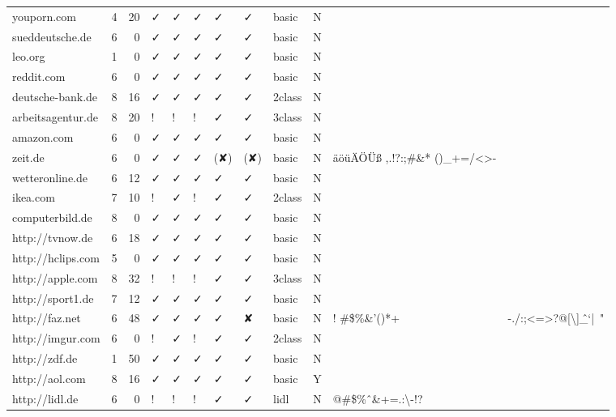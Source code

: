 {\begin{longtable}{lrrlllllllp{1cm}p{1cm}}
		youporn.com & 4     & 20    & ✓ & ✓ & ✓ & ✓ & ✓ & basic & N     &       &  \\
		sueddeutsche.de & 6     & 0     & ✓ & ✓ & ✓ & ✓ & ✓ & basic & N     &       &  \\
		leo.org & 1     & 0     & ✓ & ✓ & ✓ & ✓ & ✓ & basic & N     &       &  \\
		reddit.com & 6     & 0     & ✓ & ✓ & ✓ & ✓ & ✓ & basic & N     &       &  \\
		deutsche-bank.de & 8     & 16    & ✓ & ✓ & ✓ & ✓ & ✓ & 2class & N     &       &  \\
		arbeitsagentur.de & 8     & 20    & ! & ! & ! & ✓ & ✓ & 3class & N     &       &  \\
		amazon.com & 6     & 0     & ✓ & ✓ & ✓ & ✓ & ✓ & basic & N     &       &  \\
		zeit.de & 6     & 0     & ✓ & ✓ & ✓ & (✘) & (✘) & basic & N     & \multicolumn{1}{l}{äöüÄÖÜß ,.!?:;\#\&* ()\_+=/<>-} &  \\
		wetteronline.de & 6     & 12    & ✓ & ✓ & ✓ & ✓ & ✓ & basic & N     &       &  \\
		ikea.com & 7     & 10    & ! & ✓ & ! & ✓ & ✓ & 2class & N     &       &  \\
		computerbild.de & 8     & 0     & ✓ & ✓ & ✓ & ✓ & ✓ & basic & N     &       &  \\
		http://tvnow.de & 6     & 18    & ✓ & ✓ & ✓ & ✓ & ✓ & basic & N     &       &  \\
		http://hclips.com & 5     & 0     & ✓ & ✓ & ✓ & ✓ & ✓ & basic & N     &       &  \\
		http://apple.com & 8     & 32    & ! & ! & ! & ✓ & ✓ & 3class & N     &       &  \\
		http://sport1.de & 7     & 12    & ✓ & ✓ & ✓ & ✓ & ✓ & basic & N     &       &  \\
		http://faz.net & 6     & 48    & ✓ & ✓ & ✓ & ✓ & ✘ & basic & N     & \multicolumn{1}{l}{! \#\$\%\&'()*+} & \multicolumn{1}{l}{-./:;<=>?@[\textbackslash{}]\^\_`{|}~"} \\
		http://imgur.com & 6     & 0     & ! & ✓ & ! & ✓ & ✓ & 2class & N     &       &  \\
		http://zdf.de & 1     & 50    & ✓ & ✓ & ✓ & ✓ & ✓ & basic & N     &       &  \\
		http://aol.com & 8     & 16    & ✓ & ✓ & ✓ & ✓ & ✓ & basic & Y     &       &  \\
		http://lidl.de & 6     & 0     & ! & ! & ! & ✓ & ✓ & lidl  & N     & \multicolumn{1}{l}{@\#\$\%ˆ\&+=.:\textbackslash{}-!?} &  \\

\end{longtable}}
